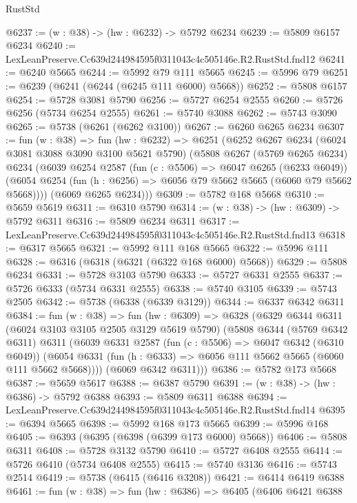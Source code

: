 \begin{lexlean}{RustStd}
\begin{coremodule}
@6237 := (w : @38) -> (hw : @6232) -> @5792 @6234
@6239 := @5809 @6157 @6234
@6240 := LexLeanPreserve.Cc639d244984595f0311043c4c505146e.R2.RustStd.fnd12
@6241 := @6240 @5665
@6244 := @5992 @79 @111 @5665
@6245 := @5996 @79
@6251 := @6239 (@6241 (@6244 (@6245 @111 @6000) @5668))
@6252 := @5808 @6157
@6254 := @5728 @3081 @5790
@6256 := @5727 @6254 @2555
@6260 := @5726 @6256 (@5734 @6254 @2555)
@6261 := @5740 @3088
@6262 := @5743 @3090
@6265 := @5738 (@6261 (@6262 @3100))
@6267 := @6260 @6265 @6234
@6307 := fun (w : @38) =>
  fun (hw : @6232) =>
  @6251
    (@6252
      @6267
      @6234
      (@6024 @3081 @3088 @3090 @3100 @5621 @5790)
      (@5808
        @6267
        (@5769 @6265 @6234)
        @6234
        (@6039
          @6254
          @2587
          (fun (c : @5506) => @6047 @6265 (@6233 @6049))
          (@6054 @6254 (fun (h : @6256) => @6056 @79 @5662 @5665 (@6060 @79 @5662 @5668))))
        (@6069 @6265 @6234)))
@6309 := @5782 @168 @5668
@6310 := @5659 @5619
@6311 := @6310 @5790
@6314 := (w : @38) -> (hw : @6309) -> @5792 @6311
@6316 := @5809 @6234 @6311
@6317 := LexLeanPreserve.Cc639d244984595f0311043c4c505146e.R2.RustStd.fnd13
@6318 := @6317 @5665
@6321 := @5992 @111 @168 @5665
@6322 := @5996 @111
@6328 := @6316 (@6318 (@6321 (@6322 @168 @6000) @5668))
@6329 := @5808 @6234
@6331 := @5728 @3103 @5790
@6333 := @5727 @6331 @2555
@6337 := @5726 @6333 (@5734 @6331 @2555)
@6338 := @5740 @3105
@6339 := @5743 @2505
@6342 := @5738 (@6338 (@6339 @3129))
@6344 := @6337 @6342 @6311
@6384 := fun (w : @38) =>
  fun (hw : @6309) =>
  @6328
    (@6329
      @6344
      @6311
      (@6024 @3103 @3105 @2505 @3129 @5619 @5790)
      (@5808
        @6344
        (@5769 @6342 @6311)
        @6311
        (@6039
          @6331
          @2587
          (fun (c : @5506) => @6047 @6342 (@6310 @6049))
          (@6054 @6331 (fun (h : @6333) => @6056 @111 @5662 @5665 (@6060 @111 @5662 @5668))))
        (@6069 @6342 @6311)))
@6386 := @5782 @173 @5668
@6387 := @5659 @5617
@6388 := @6387 @5790
@6391 := (w : @38) -> (hw : @6386) -> @5792 @6388
@6393 := @5809 @6311 @6388
@6394 := LexLeanPreserve.Cc639d244984595f0311043c4c505146e.R2.RustStd.fnd14
@6395 := @6394 @5665
@6398 := @5992 @168 @173 @5665
@6399 := @5996 @168
@6405 := @6393 (@6395 (@6398 (@6399 @173 @6000) @5668))
@6406 := @5808 @6311
@6408 := @5728 @3132 @5790
@6410 := @5727 @6408 @2555
@6414 := @5726 @6410 (@5734 @6408 @2555)
@6415 := @5740 @3136
@6416 := @5743 @2514
@6419 := @5738 (@6415 (@6416 @3208))
@6421 := @6414 @6419 @6388
@6461 := fun (w : @38) =>
  fun (hw : @6386) =>
  @6405
    (@6406
      @6421
      @6388

\end{coremodule}
\end{lexlean}
